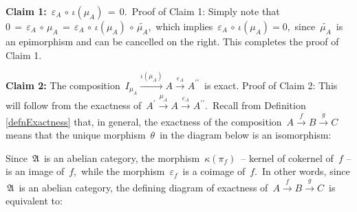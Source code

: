 \begin{enumerate}
	\vskip 0.3cm
	\textbf{Claim 1:}\;
	\,$\varepsilon_{A} \,\circ\, \iota(\mu_{A}) \,=\, 0$.\,
	\vskip 0.01cm
	Proof of Claim 1:\; Simply note that
	\,$0 \,=\, \varepsilon_{A} \,\circ\, \mu_{A} \,=\,\varepsilon_{A} \,\circ\, \iota(\mu_{A}) \,\circ\, \widetilde{\mu_{A}}$,\,
	which implies
	\,$\varepsilon_{A} \,\circ\, \iota(\mu_{A}) = 0$,\,
	since \,$\widetilde{\mu_{A}}$\, is an epimorphism and can be cancelled on the right.
	This completes the proof of Claim 1.	


	\vskip 0.3cm
	\textbf{Claim 2:}\;
	The composition
	\,$I_{\mu_{A}} \overset{\iota(\mu_{A})}{\longrightarrow} A \overset{\varepsilon_{A}}{\longrightarrow} A^{\prime\prime}$\,
	is exact.
	\vskip 0.01cm
	Proof of Claim 2:\;
	This will follow from the exactness of
	\,$A^{\prime} \overset{\mu_{A}}{\longrightarrow} A \overset{\varepsilon_{A}}{\longrightarrow} A^{\prime\prime}$.\,
	Recall from Definition \ref{defnExactness} that, in general, the exactness of the composition
	\,$A \overset{f}{\longrightarrow} B \overset{g}{\longrightarrow} C$\,
	means that the unique morphism \,$\theta$\, in the diagram below is an isomorphism:
	\begin{center}
	\end{center}
	Since \,$\mathfrak{A}$\, is an abelian category,
	the morphism \,$\kappa(\pi_{f})$\, -- kernel of cokernel of \,$f$ --
	is an image of \,$f$,\,
	while the morphism \,$\varepsilon_{f}$\, is a coimage of \,$f$.\,
	In other words, since \,$\mathfrak{A}$\, is an abelian category,
	the defining diagram of exactness of
	\,$A \overset{f}{\longrightarrow} B \overset{g}{\longrightarrow} C$\,
	is equivalent to:
	\begin{center}
\end{center}
\end{enumerate}
